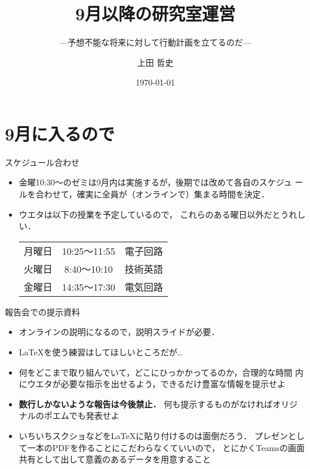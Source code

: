 \documentclass[unicode,12pt,aspectratio=169]{beamer}
\title{9月以降の研究室運営}
\subtitle{---予想不能な将来に対して行動計画を立てるのだ---}
\author[T. Ueta]{上田 哲史}
\institute{徳島大学 情報センター}
\date{\today}
\begin{document}
\begin{frame}
\maketitle
\end{frame}

\section{9月に入るので}

\begin{frame}{スケジュール合わせ}
\begin{itemize}
\item 金曜10:30〜のゼミは9月内は実施するが，後期では改めて各自のスケジュ
ールを合わせて，確実に全員が（オンラインで）集まる時間を決定．
\item ウエタは以下の授業を予定しているので，
これらのある曜日以外だとうれしい．\par

\centering
\begin{tabular}{ccc}
月曜日 & 10:25〜11:55 & 電子回路 \\
火曜日 & 8:40〜10:10 & 技術英語 \\
金曜日 & 14:35〜17:30 & 電気回路 \\
\end{tabular}
\end{itemize}
\end{frame}

\begin{frame}{報告会での提示資料}
\begin{itemize}
\item オンラインの説明になるので，説明スライドが必要．
\item \LaTeX を使う練習はしてほしいところだが…
\item 何をどこまで取り組んでいて，どこにひっかかってるのか，合理的な時間
内にウエタが必要な指示を出せるよう，できるだけ豊富な情報を提示せよ
\item \textbf{数行しかないような報告は今後禁止．}
何も提示するものがなければオリジ
ナルのポエムでも発表せよ
\item いちいちスクショなどを\LaTeX に貼り付けるのは面倒だろう．
プレゼンとして一本のPDFを作ることにこだわらなくていいので，
とにかくTeamsの画面共有として出して意義のあるデータを用意すること
\end{itemize}
\end{frame}
\end{document}
